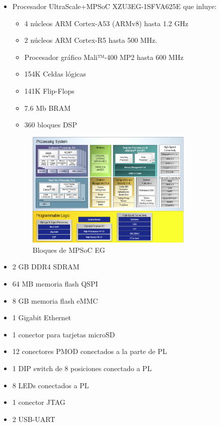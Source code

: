 \begin{itemize}
  \item Procesador UltraScale+\texttrademark MPSoC XZU3EG-1SFVA625E que inluye:
  \begin{itemize}
    \item 4 núcleos ARM Cortex-A53 (ARMv8) hasta 1.2 GHz
    \item 2 núcleos ARM Cortex-R5 hasta 500 MHz.
    \item Procesador gráfico Mali™-400 MP2 hasta 600 MHz
    \item 154K Celdas lógicas
    \item 141K Flip-Flops
    \item 7.6 Mb \acrshort{BRAM}
    \item 360 bloques \acrshort{DSP}
    \end{itemize}

    \begin{figure}[h]
    	\centering
    	\includegraphics[width=0.75\textwidth]{recursos/mpsoc_arch.png}
    	\caption{Bloques de MPSoC EG}
    	\label{fig:mpsoc_arch}
    \end{figure}

  \item 2 GB \acrshort{DDR}4 \acrshort{SDRAM}
  \item 64 MB memoria flash \acrshort{QSPI}
  \item 8 GB memoria flash \acrshort{eMMC}
  \item 1 Gigabit Ethernet
  \item 1 conector para tarjetas microSD
  \item 12 conectores \acrshort{PMOD} conectados a la parte de \acrshort{PL}
  \item 1 \acrshort{DIP} switch de 8 posiciones conectado a \acrshort{PL}
  \item 8 LEDs conectados a \acrshort{PL}
  \item 1 conector \acrshort{JTAG}
  \item 2 \acrshort{USB}-\acrshort{UART}
\end{itemize}

